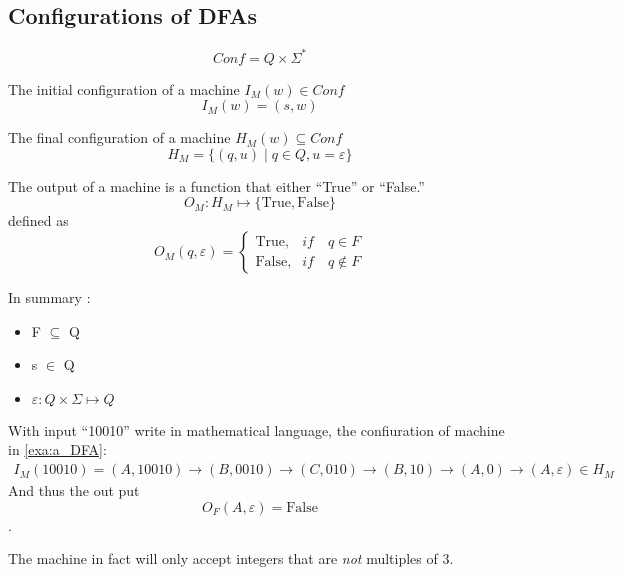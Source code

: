 

\subsection{Configurations of DFAs}

\begin{definition}[Configuration]
    \[
        Conf = Q \times \Sigma^*
    \]
\end{definition}

\begin{definition}
    The initial configuration of a machine $I_M(w) \in Conf$
    \[
        I_M(w) = (s,w)
    \]
\end{definition}

\begin{definition}
    The final configuration of a machine $H_M(w) \subseteq Conf$
    \[
        H_M = \{ (q,u) \mid q \in Q, u = \varepsilon \} 
    \]
\end{definition}

\begin{definition}
The output of a machine is a function that either ``True'' or ``False.''
    \[
        O_M: H_M \mapsto \{\text {True}, \text {False}\}
    \]
    defined as
    \[
        O_M(q,\varepsilon)
        = \begin{cases}
            \text{True},  & if \quad q \in F \\
            \text{False}, & if \quad q \notin F
        \end{cases}
    \]
\end{definition}

In summary $\colon$
\begin{itemize}
\item F $\subseteq$ Q
\item s $\in$ Q
\item $\varepsilon: Q \times \Sigma \mapsto Q$
\end{itemize}

\begin{example} 
    With input ``10010'' write in mathematical language, the confiuration of machine in
    \autoref{exa:a_DFA}:
    \begin{align*}
        I_M(10010) 
        = (A,10010)
        \rightarrow      (B,0010)
        \rightarrow      (C,010)
        \rightarrow      (B,10)
        \rightarrow      (A,0)
        \rightarrow      (A, \varepsilon) \in H_M
    \end{align*}
    And thus the out put 
    \[
        O_F(A,\varepsilon) = \text{False}
    \].

    The machine in fact will only accept integers that are \emph{not} multiples of 3.
\end{example}


